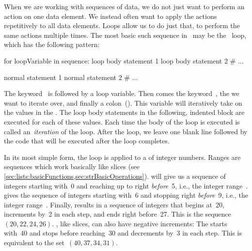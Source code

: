 %
%
When we are working with sequences of data, we do not just want to perform an action on one data element.
We instead often want to apply the actions repetitively to all data elements.
Loops allow us to do just that, to perform the same actions multiple times.%
%
%
%
%
%
The most basic such sequence in \python\ may be the ~loop, which has the following pattern:%
%
\begin{pythonSyntax}
for loopVariable in sequence:
    loop body statement 1
    loop body statement 2
    # ...

normal statement 1
normal statement 2
# ...
\end{pythonSyntax}
%
%
%
%
%
%
%
%
The keyword~ is followed by a loop variable.
Then comes the keyword~, the  we want to iterate over, and finally a colon~(\pythonilIdx{:}).
This variable will iteratively take on the values in the .
The loop body statements in the following, indented block are executed for each of these values.
Each time the body of the loop is executed is called an~\emph{iteration} of the loop.
After the loop, we leave one blank line followed by the code that will be executed after the loop completes.

In its most simple form, the  loop is applied to a  of integer numbers.
Ranges are sequences which work basically like slices (see \cref{sec:lists:basicFunctions,sec:strBasicOperations}).
 will give us a sequence of integers starting with~0 and reaching up to right \emph{before}~5, i.e., the integer range~.
 gives the sequence of integers starting with~6 and stopping right \emph{before}~9, i.e., the integer range~.
Finally,  results in a sequence of integers that begins at~20, increments by~2 in each step, and ends right before~27.
This is the sequence~$(20, 22, 24, 26)$.
, like slices, can also have negative increments:
The  starts with~40 and stops before reaching~30 and decrements by~3 in each step.
This is equivalent to the set~$(40, 37, 34, 31)$.

